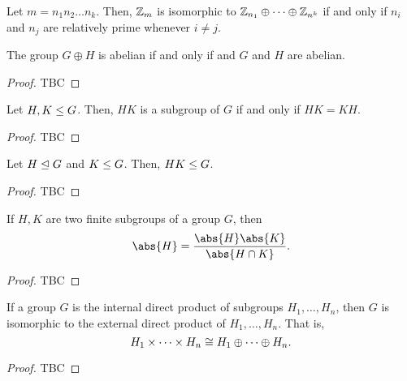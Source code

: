 \documentclass[11pt]{penrose}
\begin{document}
\begin{ncor}
    Let $m = n_{1} n_{2} \dots n_{k}$. Then, $\mathbb{Z}_{m}$ is isomorphic to $\mathbb{Z}_{n_{1}} \oplus \dots \oplus \mathbb{Z}_{n^{k}}$ if and only if $n_{i}$ and $n_{j}$ are relatively prime whenever $i \neq j$.
\end{ncor}

\begin{nlemma}
    The group $G \oplus H$ is abelian if and only if and $G$ and $H$ are abelian.
\end{nlemma}
\begin{proof}
    TBC
\end{proof}


\begin{nthm}
    Let $H, K \mathrel{\leq} G$. Then, $HK$ is a subgroup of $G$ if and only if $HK = KH$.
\end{nthm}
\begin{proof}
    TBC
\end{proof}

\begin{nthm}
    Let $H \mathrel{\trianglelefteq} G$ and $K \mathrel{\leq} G$. Then, $HK \mathrel{\leq} G$.
\end{nthm}
\begin{proof}
    TBC
\end{proof}

\begin{nthm}
    If $H, K$ are two finite subgroups of a group $G$, then
    \begin{equation*}
        \abs{H} = \frac{\abs{H} \abs{K}}{\abs{H \cap K}}.
    \end{equation*}
\end{nthm}
\begin{proof}
    TBC
\end{proof}


\begin{nthm}
    If a group $G$ is the internal direct product of subgroups $H_{1}, \dots, H_{n}$, then $G$ is isomorphic to the external direct product of $H_{1}, \dots, H_{n}$. That is,
    \begin{equation*}
        H_{1} \times \dots \times H_{n} \mathrel{\cong} H_{1} \oplus \dots \oplus H_{n}.
    \end{equation*}
\end{nthm}
\begin{proof}
    TBC
\end{proof}
\end{document}
